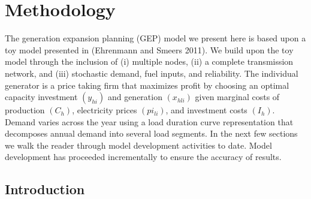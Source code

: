 \documentclass[10pt]{amsart}
\begin{document}
\section{Methodology}
The generation expansion planning (GEP) model we present here is based upon a toy model presented in (Ehrenmann and Smeers 2011). We build upon the toy model through the inclusion of (i) multiple nodes, (ii) a complete transmission network, and (iii) stochastic demand, fuel inputs, and reliability. 
The individual generator is a price taking firm that maximizes profit by choosing an optimal capacity investment $(y_{hi})$ and generation $(x_{hli})$ given marginal costs of production $(C_h)$, electricity prices $(pi_{li})$, and investment costs $(I_{h})$.
Demand varies across the year using a load duration curve representation that decomposes annual demand into several load segments. 
In the next few sections we walk the reader through model development activities to date. 
Model development has proceeded incrementally to ensure the accuracy of results. 


\subsection{Introduction}
	
	
\end{document}
